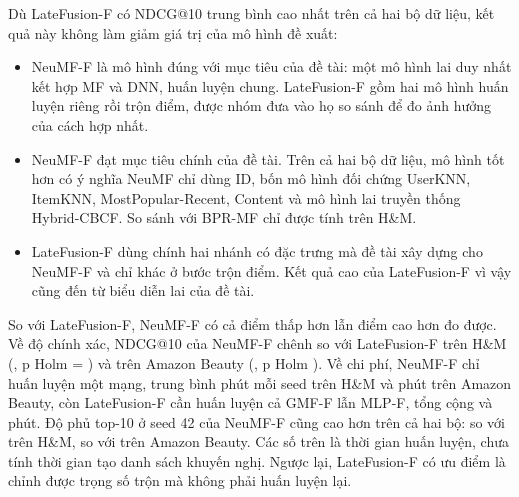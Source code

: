 Dù LateFusion-F có NDCG@10 trung bình cao nhất trên cả hai bộ dữ liệu, kết quả này không làm giảm giá trị của mô hình đề xuất:
\begin{itemize}
    \item NeuMF-F là mô hình đúng với mục tiêu của đề tài: một mô hình lai duy nhất kết hợp MF và DNN, huấn luyện chung. LateFusion-F gồm hai mô hình huấn luyện riêng rồi trộn điểm, được nhóm đưa vào họ so sánh để đo ảnh hưởng của cách hợp nhất.
    \item NeuMF-F đạt mục tiêu chính của đề tài. Trên cả hai bộ dữ liệu, mô hình tốt hơn có ý nghĩa NeuMF chỉ dùng ID, bốn mô hình đối chứng UserKNN, ItemKNN, MostPopular-Recent, Content và mô hình lai truyền thống Hybrid-CBCF. So sánh với BPR-MF chỉ được tính trên H\&M.
    \item LateFusion-F dùng chính hai nhánh có đặc trưng mà đề tài xây dựng cho NeuMF-F và chỉ khác ở bước trộn điểm. Kết quả cao của LateFusion-F vì vậy cũng đến từ biểu diễn lai của đề tài.
\end{itemize}

So với LateFusion-F, NeuMF-F có cả điểm thấp hơn lẫn điểm cao hơn đo được. Về độ chính xác, NDCG@10 của NeuMF-F chênh  so với LateFusion-F trên H\&M (, p Holm = ) và  trên Amazon Beauty (, p Holm ). Về chi phí, NeuMF-F chỉ huấn luyện một mạng, trung bình  phút mỗi seed trên H\&M và  phút trên Amazon Beauty, còn LateFusion-F cần huấn luyện cả GMF-F lẫn MLP-F, tổng cộng  và  phút. Độ phủ top-10 ở seed 42 của NeuMF-F cũng cao hơn trên cả hai bộ:  so với  trên H\&M,  so với  trên Amazon Beauty. Các số trên là thời gian huấn luyện, chưa tính thời gian tạo danh sách khuyến nghị. Ngược lại, LateFusion-F có ưu điểm là chỉnh được trọng số trộn mà không phải huấn luyện lại.

